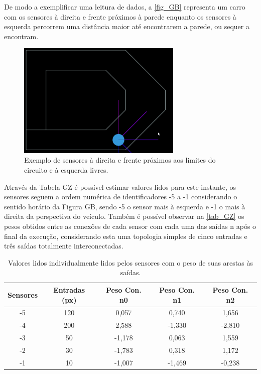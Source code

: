 De modo a exemplificar uma leitura de dados, a \autoref{fig_GB} representa um carro com os sensores à direita e frente próximos à parede enquanto os sensores à esquerda percorrem uma distância maior até encontrarem a parede, ou sequer a encontram.

\begin{figure}[htb]
        \centering
        \caption{\label{fig_GB}Exemplo de sensores à direita e frente próximos aos limites do circuito e à esquerda livres.}
        \includegraphics[width=0.7\textwidth]{images/GB.png}
\end{figure}

Através da Tabela GZ é possível estimar valores lidos para este instante, os sensores seguem a ordem numérica de identificadores -5 a -1 considerando o sentido horário da Figura GB, sendo -5 o sensor mais à esquerda e -1 o mais à direita da perspectiva do veículo. Também é possível observar na \autoref{tab_GZ} os pesos obtidos entre as conexões de cada sensor com cada uma das saídas n após o final da execução, considerando esta uma topologia simples de cinco entradas e três saídas totalmente interconectadas.

\begin{table}[htb]
	\centering
    \caption{\label{tab_GZ}Valores lidos individualmente lidos pelos sensores com o peso de suas arestas às saídas.}
    \begin{tabular}{ccccc}
        \hline
		\textbf{Sensores} & \textbf{Entradas (px)} & \textbf{Peso Con. n0} & \textbf{Peso Con. n1} & \textbf{Peso Con. n2} \\ \hline
		-5 & 120  & 0,057   & 0,740  & 1,656   \\ \hline
		-4 & 200  & 2,588   & -1,330  & -2,810   \\ \hline
		-3 & 50  & -1,178   & 0,063  & 1,559   \\ \hline
		-2 & 30  & -1,783   & 0,318  & 1,172  \\ \hline
		-1 & 10  & -1,007   & -1,469  & -0,238   \\ \hline
    \end{tabular}
\end{table}

